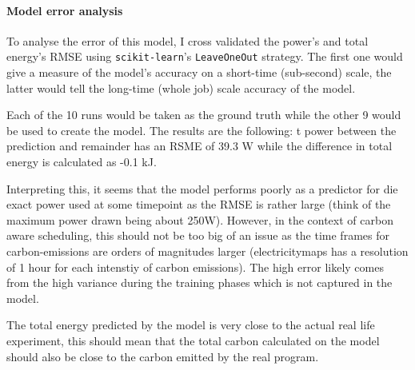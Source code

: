 \paragraph{Model error analysis}

To analyse the error of this model, I cross validated the power's and total energy's RMSE using \verb|scikit-learn|'s \verb|LeaveOneOut| strategy. 
The first one would give a measure of the model's accuracy on a short-time (sub-second) scale, the latter would  tell the long-time (whole job) scale accuracy of the model.

Each of the 10 runs would be taken as the ground truth while the other 9 would be used to create the model. The results are the following: t power between the prediction and remainder has an RSME of 39.3 W while the difference in total energy is calculated as -0.1 kJ. 

Interpreting this, it seems that the model performs poorly as a predictor for die exact power used at some timepoint as the RMSE is rather large (think of the maximum power drawn being about 250W). 
However, in the context of carbon aware scheduling, this should not be too big of an issue as the time frames for carbon-emissions are orders of magnitudes larger (electricitymaps has a resolution of 1 hour for each intenstiy of carbon emissions). 
The high error likely comes from the high variance during the training phases which is not captured in the model.

The total energy predicted by the model is very close to the actual real life experiment, this should mean that the total carbon calculated on the model should also be close to the carbon emitted by the real program.
